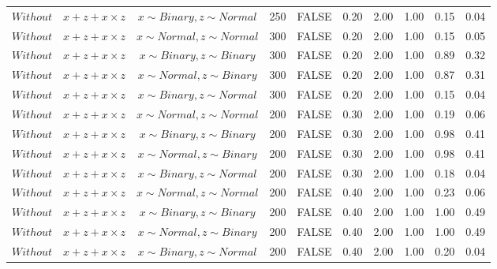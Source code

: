 \begin{longtable}{lccccccccc}
  $Without$ & $\textit{x} + \textit{z} + \textit{x} \times \textit{z}$ & $\textit{x} \sim Binary, \textit{z} \sim Normal$ & 250 & FALSE & 0.20 & 2.00 & 1.00 & 0.15 & 0.04 \\ 
  $Without$ & $\textit{x} + \textit{z} + \textit{x} \times \textit{z}$ & $\textit{x} \sim Normal , \textit{z} \sim Normal$ & 300 & FALSE & 0.20 & 2.00 & 1.00 & 0.15 & 0.05 \\ 
  $Without$ & $\textit{x} + \textit{z} + \textit{x} \times \textit{z}$ & $\textit{x} \sim Binary, \textit{z} \sim Binary$ & 300 & FALSE & 0.20 & 2.00 & 1.00 & 0.89 & 0.32 \\ 
  $Without$ & $\textit{x} + \textit{z} + \textit{x} \times \textit{z}$ & $\textit{x} \sim Normal, \textit{z} \sim Binary$ & 300 & FALSE & 0.20 & 2.00 & 1.00 & 0.87 & 0.31 \\ 
  $Without$ & $\textit{x} + \textit{z} + \textit{x} \times \textit{z}$ & $\textit{x} \sim Binary, \textit{z} \sim Normal$ & 300 & FALSE & 0.20 & 2.00 & 1.00 & 0.15 & 0.04 \\ 
  $Without$ & $\textit{x} + \textit{z} + \textit{x} \times \textit{z}$ & $\textit{x} \sim Normal , \textit{z} \sim Normal$ & 200 & FALSE & 0.30 & 2.00 & 1.00 & 0.19 & 0.06 \\ 
  $Without$ & $\textit{x} + \textit{z} + \textit{x} \times \textit{z}$ & $\textit{x} \sim Binary, \textit{z} \sim Binary$ & 200 & FALSE & 0.30 & 2.00 & 1.00 & 0.98 & 0.41 \\ 
  $Without$ & $\textit{x} + \textit{z} + \textit{x} \times \textit{z}$ & $\textit{x} \sim Normal, \textit{z} \sim Binary$ & 200 & FALSE & 0.30 & 2.00 & 1.00 & 0.98 & 0.41 \\ 
  $Without$ & $\textit{x} + \textit{z} + \textit{x} \times \textit{z}$ & $\textit{x} \sim Binary, \textit{z} \sim Normal$ & 200 & FALSE & 0.30 & 2.00 & 1.00 & 0.18 & 0.04 \\ 
  $Without$ & $\textit{x} + \textit{z} + \textit{x} \times \textit{z}$ & $\textit{x} \sim Normal , \textit{z} \sim Normal$ & 200 & FALSE & 0.40 & 2.00 & 1.00 & 0.23 & 0.06 \\ 
  $Without$ & $\textit{x} + \textit{z} + \textit{x} \times \textit{z}$ & $\textit{x} \sim Binary, \textit{z} \sim Binary$ & 200 & FALSE & 0.40 & 2.00 & 1.00 & 1.00 & 0.49 \\ 
  $Without$ & $\textit{x} + \textit{z} + \textit{x} \times \textit{z}$ & $\textit{x} \sim Normal, \textit{z} \sim Binary$ & 200 & FALSE & 0.40 & 2.00 & 1.00 & 1.00 & 0.49 \\ 
  $Without$ & $\textit{x} + \textit{z} + \textit{x} \times \textit{z}$ & $\textit{x} \sim Binary, \textit{z} \sim Normal$ & 200 & FALSE & 0.40 & 2.00 & 1.00 & 0.20 & 0.04 \\ 

\end{longtable}
